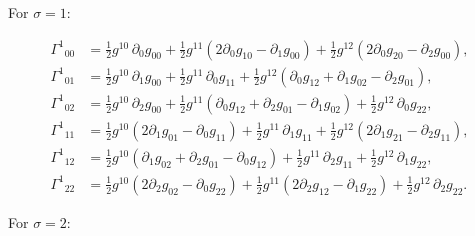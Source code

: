 \documentclass[
]{article}
\begin{document}
For \(\sigma = 1\):

\[\begin{aligned}
\Gamma^{1}{}_{00} &= \tfrac{1}{2} g^{10}\, \partial_{0} g_{00} + \tfrac{1}{2} g^{11} \left( 2 \partial_{0} g_{10} - \partial_{1} g_{00} \right) + \tfrac{1}{2} g^{12} \left( 2 \partial_{0} g_{20} - \partial_{2} g_{00} \right), \\
\Gamma^{1}{}_{01} &= \tfrac{1}{2} g^{10}\, \partial_{1} g_{00} + \tfrac{1}{2} g^{11}\, \partial_{0} g_{11} + \tfrac{1}{2} g^{12} \left( \partial_{0} g_{12} + \partial_{1} g_{02} - \partial_{2} g_{01} \right), \\
\Gamma^{1}{}_{02} &= \tfrac{1}{2} g^{10}\, \partial_{2} g_{00} + \tfrac{1}{2} g^{11} \left( \partial_{0} g_{12} + \partial_{2} g_{01} - \partial_{1} g_{02} \right) + \tfrac{1}{2} g^{12}\, \partial_{0} g_{22}, \\
\Gamma^{1}{}_{11} &= \tfrac{1}{2} g^{10} \left( 2 \partial_{1} g_{01} - \partial_{0} g_{11} \right) + \tfrac{1}{2} g^{11}\, \partial_{1} g_{11} + \tfrac{1}{2} g^{12} \left( 2 \partial_{1} g_{21} - \partial_{2} g_{11} \right), \\
\Gamma^{1}{}_{12} &= \tfrac{1}{2} g^{10} \left( \partial_{1} g_{02} + \partial_{2} g_{01} - \partial_{0} g_{12} \right) + \tfrac{1}{2} g^{11}\, \partial_{2} g_{11} + \tfrac{1}{2} g^{12}\, \partial_{1} g_{22}, \\
\Gamma^{1}{}_{22} &= \tfrac{1}{2} g^{10} \left( 2 \partial_{2} g_{02} - \partial_{0} g_{22} \right) + \tfrac{1}{2} g^{11} \left( 2 \partial_{2} g_{12} - \partial_{1} g_{22} \right) + \tfrac{1}{2} g^{12}\, \partial_{2} g_{22}.
\end{aligned} \tag{54}\]

For \(\sigma = 2\):
\end{document}
